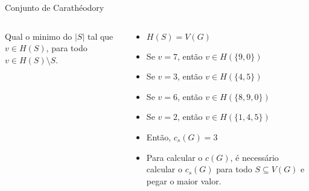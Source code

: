 \begin{frame}{Conjunto de Carathéodory}
\begin{columns}[T]
\begin{column}{0.4\textwidth}

                  Qual o minimo do $|S|$ tal que $v\in H(S)$, para todo $v\in H(S) \setminus S$.
            \end{column}
            \begin{column}{0.6\textwidth}
                  \begin{itemize}
                        \item<2-> $H(S)=V(G)$
                        \item<3-> Se $v=7$, então $v\in H(\{9,0\})$
                        \item<4-> Se $v=3$, então $v\in H(\{4,5\})$
                        \item<5-> Se $v=6$, então $v\in H(\{8,9,0\})$
                        \item<6-> Se $v=2$, então $v\in H(\{1,4,5\})$
                        \item<7-> Então, $c_s(G)=3$
                        \item<8-> Para calcular o $c(G)$, é necessário calcular o $c_s(G)$ para todo $S \subseteq V(G)$ e pegar o maior valor.
                  \end{itemize}
            \end{column}
      \end{columns}
\end{frame}

